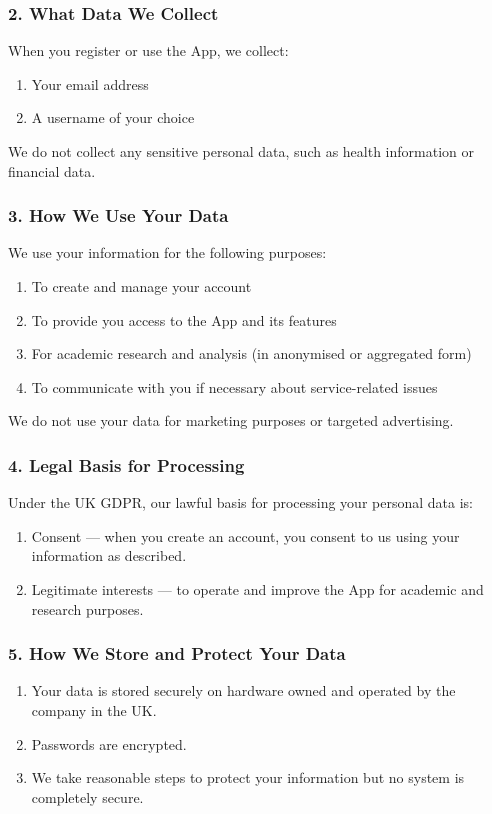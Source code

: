 \subsubsection*{2. What Data We Collect}
When you register or use the App, we collect:
\begin{enumerate}
	\item Your email address
	\item A username of your choice
\end{enumerate}

We do not collect any sensitive personal data, such as health information or financial data.
\subsubsection*{3. How We Use Your Data}
We use your information for the following purposes:
\begin{enumerate}
	\item To create and manage your account
	\item To provide you access to the App and its features
	\item For academic research and analysis (in anonymised or aggregated form)
	\item To communicate with you if necessary about service-related issues
\end{enumerate}

We do not use your data for marketing purposes or targeted advertising.
\subsubsection*{4. Legal Basis for Processing}
Under the UK GDPR, our lawful basis for processing your personal data is:
\begin{enumerate}
	\item Consent — when you create an account, you consent to us using your information as described.
	\item Legitimate interests — to operate and improve the App for academic and research purposes.
\end{enumerate}
\subsubsection*{5. How We Store and Protect Your Data}
\begin{enumerate}
	\item Your data is stored securely on hardware owned and operated by the company in the UK.
	\item Passwords are encrypted.
	\item We take reasonable steps to protect your information but no system is completely secure.
\end{enumerate}
